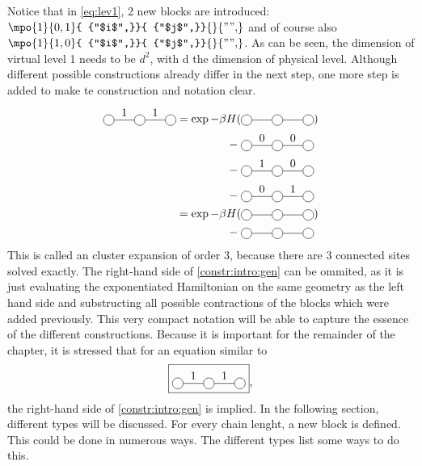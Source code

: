 Notice that in \cref{eq:lev1}, 2  new blocks are introduced: $\mpo{1}{ {0,1}  }{ {"$i$",}}{ {"$j$",}}{}{{"",}}$ and of course also $\mpo{1}{ {1,0}}{ {"$i$",}}{ {"$j$",}}{}{{"",}}$. As can be seen, the dimension of virtual level 1 needs to be $d^2$, with d the dimension of physical level. Although different possible constructions already differ in the next step, one more step is added to make te construction and notation clear.
\begin{equation}\label{constr:intro:gen}
    \begin{split}
        \mpob{3}{ {0,1,1,0}  }{}{}{}{{,,,}}  = \exp  -\beta H( &\mpob{3}{ {,,,} }{}{}{}{{,,}})  \\
        - \;&\mpob{3}{ {0,0,0,0}  }{}{}{}{{,,,}}\\
        - \; &\mpob{3}{ {0,1,0,0}  }{}{}{}{{,,,}}\\
        - \; &\mpob{3}{ {0,0,1,0}  }{}{}{}{{,,,}}\\
        =\exp  -\beta H( &\mpob{3}{ {,,,} }{}{}{}{{,,}})\\
        - \; &\mpob{3}{ {,,,}  }{}{}{}{{,,,}}\\
    \end{split}
\end{equation}
This is called an cluster expansion of order 3, because there are 3 connected sites solved exactly. The right-hand side of \cref{constr:intro:gen} can be ommited, as it is just evaluating the exponentiated Hamiltonian on the same geometry as the left hand side and substructing all possible contractions of the blocks which were added previously. This very compact notation will be able to capture the essence of the different constructions. Because it is important for the remainder of the chapter, it is stressed that for an equation similar to
\begin{equation}
    \boxed{\mpob{3}{ {0,1,1,0}  }{}{}{}{{,,,}} },
\end{equation}
the right-hand side of \cref{constr:intro:gen} is implied. In the following section, different types will be discussed. For every chain lenght, a new block is defined. This could be done in numerous ways. The different types list some ways to do this.